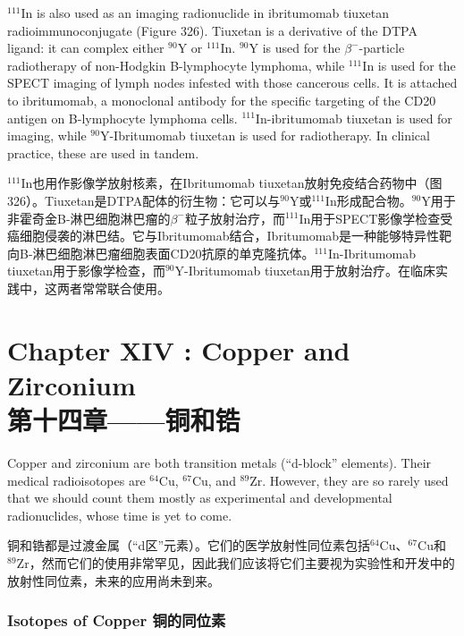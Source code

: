 \documentclass[dvipsnames, svgnames,a4paper,11pt]{article}
\begin{document}
\(\mathrm{^{111}In}\) is also used as an imaging radionuclide in ibritumomab tiuxetan radioimmunoconjugate (Figure 326). Tiuxetan is a derivative of the DTPA ligand: it can complex either \(\mathrm{^{90}Y}\) or \(\mathrm{^{111}In}\). \(\mathrm{^{90}Y}\) is used for the \(\beta^-\)-particle radiotherapy of non-Hodgkin B-lymphocyte lymphoma, while \(\mathrm{^{111}In}\) is used for the SPECT imaging of lymph nodes infested with those cancerous cells. It is attached to ibritumomab, a monoclonal antibody for the specific targeting of the CD20 antigen on B-lymphocyte lymphoma cells. \(\mathrm{^{111}In}\)-ibritumomab tiuxetan is used for imaging, while \(\mathrm{^{90}Y}\)-Ibritumomab tiuxetan is used for radiotherapy. In clinical practice, these are used in tandem.

\(\mathrm{^{111}In}\)也用作影像学放射核素，在Ibritumomab tiuxetan放射免疫结合药物中（图326）。Tiuxetan是DTPA配体的衍生物：它可以与\(\mathrm{^{90}Y}\)或\(\mathrm{^{111}In}\)形成配合物。\(\mathrm{^{90}Y}\)用于非霍奇金B-淋巴细胞淋巴瘤的\(\beta^-\)粒子放射治疗，而\(\mathrm{^{111}In}\)用于SPECT影像学检查受癌细胞侵袭的淋巴结。它与Ibritumomab结合，Ibritumomab是一种能够特异性靶向B-淋巴细胞淋巴瘤细胞表面CD20抗原的单克隆抗体。\(\mathrm{^{111}In}\)-Ibritumomab tiuxetan用于影像学检查，而\(\mathrm{^{90}Y}\)-Ibritumomab tiuxetan用于放射治疗。在临床实践中，这两者常常联合使用。

\newpage

\section{Chapter XIV :  Copper and Zirconium \\第十四章——铜和锆}

Copper and zirconium are both transition metals (“d-block” elements). Their medical radioisotopes are \(\mathrm{^{64}Cu}\), \(\mathrm{^{67}Cu}\), and \(\mathrm{^{89}Zr}\). However, they are so rarely used that we should count them mostly as experimental and developmental radionuclides, whose time is yet to come.

铜和锆都是过渡金属（“d区”元素）。它们的医学放射性同位素包括\(\mathrm{^{64}Cu}\)、\(\mathrm{^{67}Cu}\)和\(\mathrm{^{89}Zr}\)，然而它们的使用非常罕见，因此我们应该将它们主要视为实验性和开发中的放射性同位素，未来的应用尚未到来。

\subsubsection{Isotopes of Copper 铜的同位素}  
\end{document}
